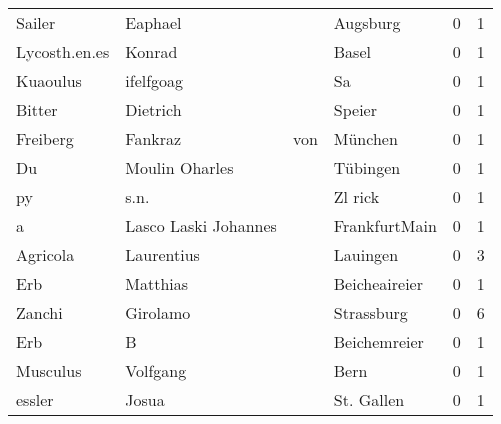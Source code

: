 \begin{center}
\begin{tiny}
\begin{longtabu}{llllrr}
                   Sailer &                            Eaphael &             &                                    Augsburg &          0 &         1 \\
            Lycosth.en.es &                             Konrad &             &                                       Basel &          0 &         1 \\
                 Kuaoulus &                          ifelfgoag &             &                                          Sa &          0 &         1 \\
                   Bitter &                           Dietrich &             &                                      Speier &          0 &         1 \\
                 Freiberg &                            Fankraz &         von &                                     München &          0 &         1 \\
                       Du &                     Moulin Oharles &             &                                    Tübingen &          0 &         1 \\
                       py &                               s.n. &             &                                     Zl rick &          0 &         1 \\
                        a &               Lasco Laski Johannes &             &                               FrankfurtMain &          0 &         1 \\
                 Agricola &                         Laurentius &             &                                    Lauingen &          0 &         3 \\
                      Erb &                           Matthias &             &                               Beicheaireier &          0 &         1 \\
                   Zanchi &                           Girolamo &             &                                  Strassburg &          0 &         6 \\
                      Erb &                                  B &             &                                Beichemreier &          0 &         1 \\
                 Musculus &                           Volfgang &             &                                        Bern &          0 &         1 \\
                   essler &                              Josua &             &                                  St. Gallen &          0 &         1 \\

\end{longtabu}
\end{tiny}
\end{center}
